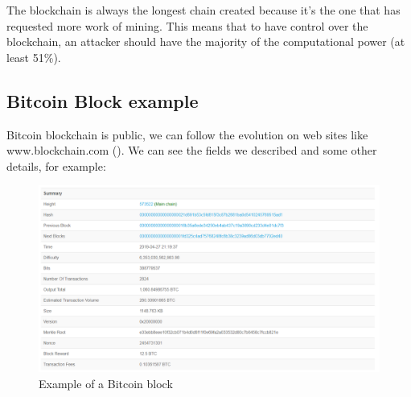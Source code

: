   The blockchain is always the longest chain created because it's the one that has requested more work of mining. This means that to have control over the blockchain, an attacker should have the majority of the computational power (at least 51\%).

    \subsection{Bitcoin Block example}

  Bitcoin blockchain is public, we can follow the evolution on web sites like www.blockchain.com (\cite{blockchain_web_site}). We can see the fields we described and some other details, for example: \newline

  \begin{figure}[ht]
  \centering
  \includegraphics[width=15cm]{Figures/Block573522}
  \caption{Example of a Bitcoin block}
  \end{figure}
